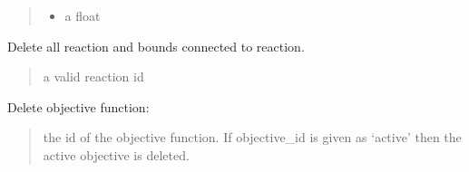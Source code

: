 \documentclass[letterpaper,12pt,english]{sphinxmanual}
\begin{document}
\begin{fulllineitems}
\begin{fulllineitems}
\begin{quote}
\begin{description}
\begin{itemize}
\item {} 
\sphinxAtStartPar
{} \textendash{} a float

\end{itemize}

\end{description}\end{quote}

\end{fulllineitems}


\begin{fulllineitems}
\label{\detokenize{api/core:cbmpy.CBModel.Model.deleteReactionAndBounds}}
\pysigstartsignatures
\pysiglinewithargsret
{}
{}
{}
\pysigstopsignatures
\sphinxAtStartPar
Delete all reaction and bounds connected to reaction.
\begin{quote}\begin{description}
\sphinxAtStartPar
{} \textendash{} a valid reaction id

\end{description}\end{quote}

\end{fulllineitems}


\begin{fulllineitems}
\label{\detokenize{api/core:cbmpy.CBModel.Model.deleteObjective}}
\pysigstartsignatures
\pysiglinewithargsret
{}
{}
{}
\pysigstopsignatures
\sphinxAtStartPar
Delete objective function:
\begin{quote}

\sphinxAtStartPar
{} the id of the objective function. If objective\_id is given  as ‘active’ then the active objective is deleted.
\end{quote}

\end{fulllineitems}



\end{fulllineitems}
\end{document}
